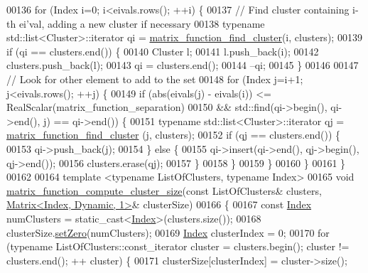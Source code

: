 \begin{DoxyCode}
00136   \textcolor{keywordflow}{for} (Index i=0; i<eivals.rows(); ++i) \{
00137     \textcolor{comment}{// Find cluster containing i-th ei'val, adding a new cluster if necessary}
00138     \textcolor{keyword}{typename} std::list<Cluster>::iterator qi = \hyperlink{namespace_eigen_1_1internal_af9cdbae9f4f166fae876c54b97c0f2bb}{matrix\_function\_find\_cluster}(i, 
      clusters);
00139     \textcolor{keywordflow}{if} (qi == clusters.end()) \{
00140       Cluster l;
00141       l.push\_back(i);
00142       clusters.push\_back(l);
00143       qi = clusters.end();
00144       --qi;
00145     \}
00146 
00147     \textcolor{comment}{// Look for other element to add to the set}
00148     \textcolor{keywordflow}{for} (Index j=i+1; j<eivals.rows(); ++j) \{
00149       \textcolor{keywordflow}{if} (abs(eivals(j) - eivals(i)) <= RealScalar(matrix\_function\_separation)
00150           && std::find(qi->begin(), qi->end(), j) == qi->end()) \{
00151         \textcolor{keyword}{typename} std::list<Cluster>::iterator qj = \hyperlink{namespace_eigen_1_1internal_af9cdbae9f4f166fae876c54b97c0f2bb}{matrix\_function\_find\_cluster}
      (j, clusters);
00152         \textcolor{keywordflow}{if} (qj == clusters.end()) \{
00153           qi->push\_back(j);
00154         \} \textcolor{keywordflow}{else} \{
00155           qi->insert(qi->end(), qj->begin(), qj->end());
00156           clusters.erase(qj);
00157         \}
00158       \}
00159     \}
00160   \}
00161 \}
00162 
00164 \textcolor{keyword}{template} <\textcolor{keyword}{typename} ListOfClusters, \textcolor{keyword}{typename} Index>
00165 \textcolor{keywordtype}{void} \hyperlink{namespace_eigen_1_1internal_a1073ba7ac499827baa04c814e4251326}{matrix\_function\_compute\_cluster\_size}(\textcolor{keyword}{const} ListOfClusters& 
      clusters, \hyperlink{group___core___module_class_eigen_1_1_matrix}{Matrix<Index, Dynamic, 1>}& clusterSize)
00166 \{
00167   \textcolor{keyword}{const} \hyperlink{namespace_eigen_a62e77e0933482dafde8fe197d9a2cfde}{Index} numClusters = \textcolor{keyword}{static\_cast<}\hyperlink{namespace_eigen_a62e77e0933482dafde8fe197d9a2cfde}{Index}\textcolor{keyword}{>}(clusters.size());
00168   clusterSize.\hyperlink{class_eigen_1_1_plain_object_base_ac21ad5f989f320e46958b75ac8d9a1da}{setZero}(numClusters);
00169   \hyperlink{namespace_eigen_a62e77e0933482dafde8fe197d9a2cfde}{Index} clusterIndex = 0;
00170   \textcolor{keywordflow}{for} (\textcolor{keyword}{typename} ListOfClusters::const\_iterator cluster = clusters.begin(); cluster != clusters.end(); ++
      cluster) \{
00171     clusterSize[clusterIndex] = cluster->size();

\end{DoxyCode}
